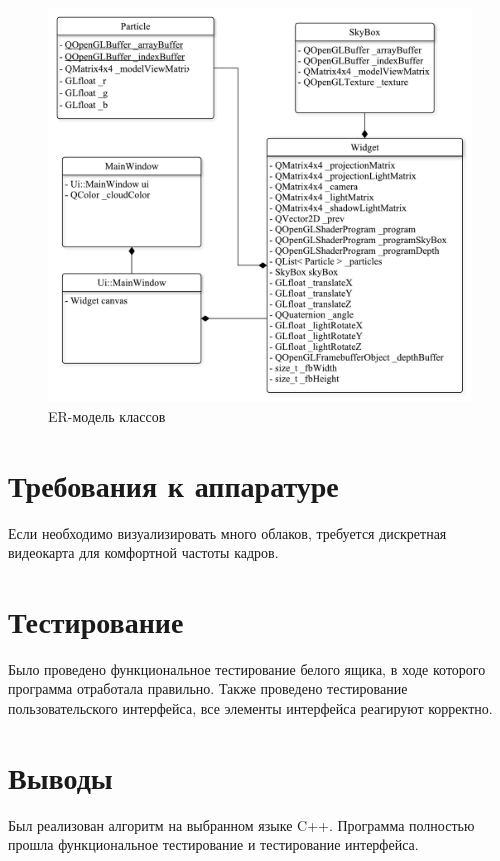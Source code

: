 \begin{figure}[H]
    \centering
    \includegraphics[scale=0.6]{img/er.pdf}
    \caption{ER-модель классов}
    \label{img:er}
\end{figure}

\section{Требования к аппаратуре}

Если необходимо визуализировать много облаков, требуется дискретная
видеокарта для комфортной частоты кадров.

\section{Тестирование}

Было проведено функциональное тестирование белого ящика, в ходе которого программа отработала
правильно. Также проведено тестирование пользовательского интерфейса, все элементы
интерфейса реагируют корректно.

\section{Выводы}

Был реализован алгоритм на выбранном языке C++. Программа полностью прошла функциональное тестирование
и тестирование интерфейса.


